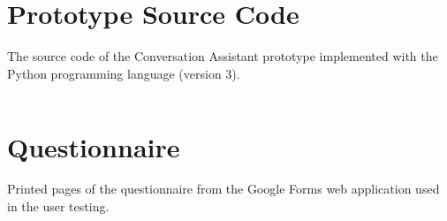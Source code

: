 \documentclass[english, 12pt, a4paper, pdftex, elec, utf8]{aaltothesis}
\begin{document}
\clearpage




\clearpage

\appendix

\section{Prototype Source Code} \label{sec:proto}

The source code of the Conversation Assistant prototype implemented with the Python programming language (version 3).

\inputminted[fontsize=\scriptsize]{python}{keskusteluavustin.py} %

\clearpage

\section{Questionnaire} \label{sec:kysely}

Printed pages of the questionnaire from the Google Forms web application used in the user testing.
\end{document}
